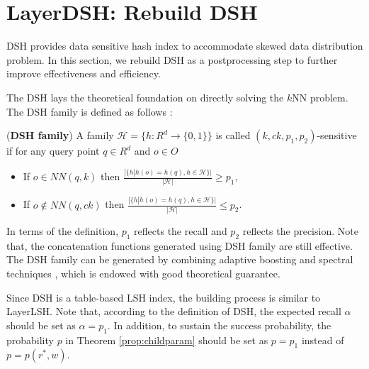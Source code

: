 \section{LayerDSH: Rebuild DSH}
\label{sec:recdsh}

DSH \cite{Gao:2014:DDS:2588555.2588565} provides data sensitive hash index to accommodate skewed data distribution problem. In this section, we rebuild DSH as a postprocessing step to further improve effectiveness and efficiency.

The DSH lays the theoretical foundation on directly solving the $k$NN problem. The DSH family is defined as follows \cite{Gao:2014:DDS:2588555.2588565}:
\begin{definition}
\label{def:dsh}
(\textbf{DSH family}) A family $\mathcal{H}=\{h:R^d\rightarrow\{0,1\}\}$ is called $(k,ck,p_1,p_2)$-sensitive if for any query point $q\in R^d$ and $o\in O$
\begin{itemize}
  \item If $o\in NN(q,k)$ then $\frac{|\{h|h(o)=h(q),h\in\mathcal{H}\}|}{|\mathcal{H}|}\geq p_1$,
  \item If $o\notin NN(q,ck)$ then $\frac{|\{h|h(o)=h(q),h\in\mathcal{H}\}|}{|\mathcal{H}|}\leq p_2$.
\end{itemize}
\end{definition}
In terms of the definition, $p_1$ reflects the recall and $p_2$ reflects the precision. Note that, the concatenation functions generated using DSH family are still effective. The DSH family can be generated by combining adaptive boosting and spectral techniques \cite{Gao:2014:DDS:2588555.2588565}, which is endowed with good theoretical guarantee.

Since DSH is a table-based LSH index, the building process is similar to LayerLSH. Note that, according to the definition of DSH, the expected recall $\alpha$ should be set as $\alpha=p_1$. In addition, to sustain the success probability, the probability $p$ in Theorem \ref{prop:childparam} should be set as $p=p_1$ instead of $p=p(r^*,w)$.




